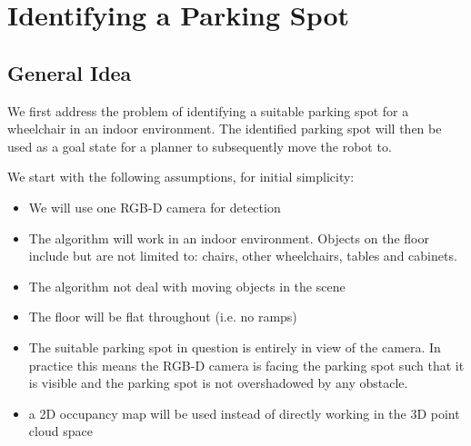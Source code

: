\chapter{Identifying a Parking Spot}


\section{General Idea}
We first address the problem of identifying a suitable parking spot for a
wheelchair in an indoor environment. The identified parking spot will then be
used as a goal state for a planner to subsequently move the robot to.

We start with the following assumptions, for initial simplicity:
\begin{itemize}
\item We will use one RGB-D camera for detection
\item The algorithm will work in an indoor environment. Objects on the floor
include but are not limited to: chairs, other wheelchairs, tables and cabinets.
\item The algorithm not deal with moving objects in the scene
\item The floor will be flat throughout (i.e. no ramps)
\item The suitable parking spot in question is entirely in view of the camera.
In practice this means the RGB-D camera is facing the parking spot such that
it is visible and the parking spot is not overshadowed by any obstacle.
\item a 2D occupancy map will be used instead of directly working in the 3D
point cloud space
\end{itemize}

